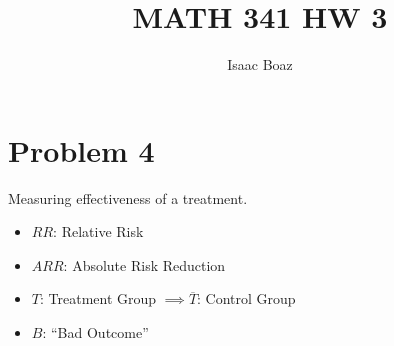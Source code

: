 \documentclass{article}
\title{\vspace{-5ex}MATH 341 HW 3}
\author{Isaac Boaz}
\begin{document}
\maketitle

\section*{Problem 4}
Measuring effectiveness of a treatment.
\begin{itemize}[noitemsep]
    \item \(RR\): Relative Risk
    \item \(ARR\): Absolute Risk Reduction
    \item \(T\): Treatment Group \(\implies \overline{T}\): Control Group
    \item \(B\): ``Bad Outcome''
\end{itemize}
\end{document}
